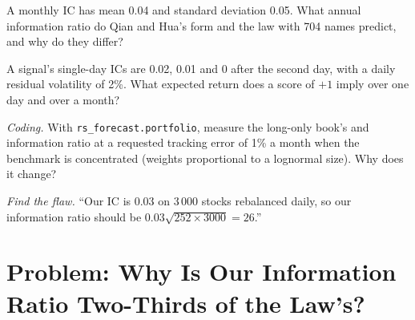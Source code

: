 \begin{exercise}[$\star\star$]\label{exo:rs:from-signal-to-forecast:5}
A monthly IC has mean 0.04 and standard deviation 0.05. What annual information ratio do Qian and Hua's form and the law with 704 names predict, and
why do they differ?
\end{exercise}

\begin{exercise}[$\star\star$]\label{exo:rs:from-signal-to-forecast:6}
A signal's single-day ICs are 0.02, 0.01 and 0 after the second day, with a daily residual volatility of 2\%. What expected return does a score of $+1$
imply over one day and over a month?
\end{exercise}

\begin{exercise}[$\star\star\star$]\label{exo:rs:from-signal-to-forecast:7}
\emph{Coding.} With \texttt{rs\_forecast.portfolio}, measure the long-only book's  and information ratio at a requested tracking
error of 1\% a month when the benchmark is concentrated (weights proportional to a lognormal size). Why does it change?
\end{exercise}

\begin{exercise}[$\star\star\star$]\label{exo:rs:from-signal-to-forecast:8}
\emph{Find the flaw.} ``Our IC is 0.03 on 3\,000 stocks rebalanced daily, so our information ratio should be $0.03\sqrt{252 \times 3000} = 26$.''
\end{exercise}

\section{Problem: Why Is Our Information Ratio Two-Thirds of the Law's?}

